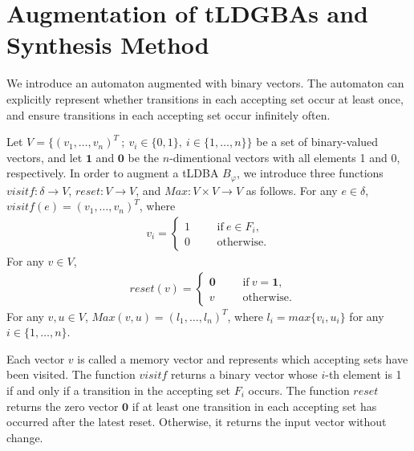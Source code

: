 \section{Augmentation of tLDGBAs and Synthesis Method}

We introduce an automaton augmented with binary vectors. The automaton can explicitly represent whether transitions in each accepting set occur at least once, and ensure transitions in each accepting set occur infinitely often.

Let $V = \{ (v_1, \ldots ,v_n)^T\ ;\ v_i \in \{ 0,1 \},\ i \in \{ 1, \ldots ,n \} \}$ be a set of binary-valued vectors, and let $\bm{1}$ and $\bm{0}$ be the $n$-dimentional vectors with all elements 1 and 0, respectively.
In order to augment a tLDBA $B_{\varphi}$, we introduce three functions $visitf:\delta \rightarrow V$, $reset:V \rightarrow V$, and $Max:V\times V \rightarrow V$ as follows.
For any $e \in \delta$, $visitf(e) = (v_1, \ldots ,v_n)^T$, where %
\begin{align}
 v_i =
  \left\{
  \begin{aligned}
    1 &   & &\text{if}\ e\in F_i, \\
    0 &   & &\text{otherwise}.
  \end{aligned}
  \right. \nonumber
\end{align}
For any $v \in V$, %
\begin{align}
  &reset(v) =
  \left\{
  \begin{aligned}
    \bm{0} &   & &\text{if}\  v = \bm{1},\\
    v &   & &\text{otherwise}.
  \end{aligned}
  \right. \nonumber
\end{align}
For any $v,u \in V$, $Max(v,u) = (l_1,\ldots ,l_n)^T$, where $l_i = max\{v_i, u_i\} $ for any $i\in \{1, \ldots ,n\}$.

Each vector $v$ is called a memory vector and represents which accepting sets have been visited. The function $visitf$ returns a binary vector whose $i$-th element is 1 if and only if a transition in the accepting set $F_i$ occurs. The function $reset$ returns the zero vector $\bm{0}$ if at least one transition in each accepting set has occurred after the latest reset. Otherwise, it returns the input vector without change.

